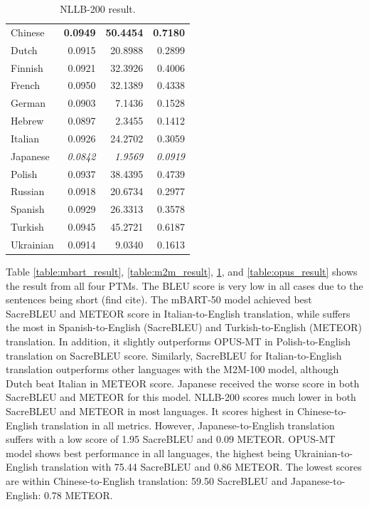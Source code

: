 \documentclass[a4paper]{article}
\begin{document}
\begin{table}[htbp]
\begin{minipage}{0.49\linewidth}
\begin{tabular}{|l|r|r|r|}
            \hline
            Chinese           & \textbf{0.0949} & \textbf{50.4454}   & \textbf{0.7180} \\
            Dutch             & 0.0915          & 20.8988            & 0.2899          \\
            Finnish           & 0.0921          & 32.3926            & 0.4006          \\
            French            & 0.0950          & 32.1389            & 0.4338          \\
            German            & 0.0903          & 7.1436             & 0.1528          \\
            Hebrew            & 0.0897          & 2.3455             & 0.1412          \\
            Italian           & 0.0926          & 24.2702            & 0.3059          \\
            Japanese          & \textit{0.0842} & \textit{1.9569}    & \textit{0.0919} \\
            Polish            & 0.0937          & 38.4395            & 0.4739          \\
            Russian           & 0.0918          & 20.6734            & 0.2977          \\
            Spanish           & 0.0929          & 26.3313            & 0.3578          \\
            Turkish           & 0.0945          & 45.2721            & 0.6187          \\
            Ukrainian         & 0.0914          & 9.0340             & 0.1613          \\
            \hline
        \end{tabular}
        \caption{NLLB-200 result.}
        \label{table:nllb_result}
    \end{minipage}
\end{table}

Table \ref{table:mbart_result}, \ref{table:m2m_result}, \ref{table:nllb_result}, and \ref{table:opus_result} shows the result from all four PTMs. The BLEU score is very low in all cases due to the sentences being short (find cite). The mBART-50 model achieved best SacreBLEU and METEOR score in Italian-to-English translation, while suffers the most in Spanish-to-English (SacreBLEU) and Turkish-to-English (METEOR) translation. In addition, it slightly outperforms OPUS-MT in Polish-to-English translation on SacreBLEU score. Similarly, SacreBLEU for Italian-to-English translation outperforms other languages with the M2M-100 model, although Dutch beat Italian in METEOR score. Japanese received the worse score in both SacreBLEU and METEOR for this model. NLLB-200 scores much lower in both SacreBLEU and METEOR in most languages. It scores highest in Chinese-to-English translation in all metrics. However, Japanese-to-English translation suffers with a low score of 1.95 SacreBLEU and 0.09 METEOR. OPUS-MT model shows best performance in all languages, the highest being Ukrainian-to-English translation with 75.44 SacreBLEU and 0.86 METEOR. The lowest scores are within Chinese-to-English translation: 59.50 SacreBLEU and Japanese-to-English: 0.78 METEOR.
\end{document}
